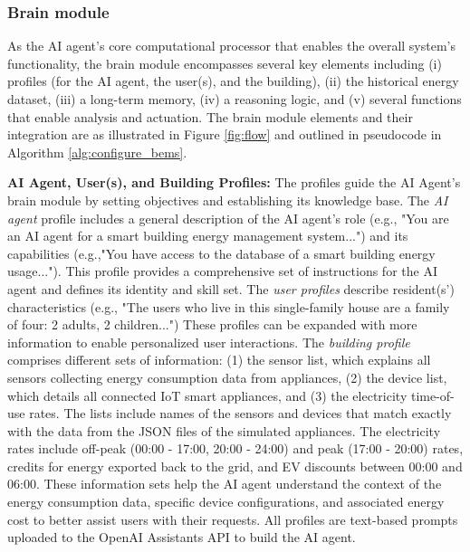 \documentclass[final,3p,times]{elsarticle}
\begin{document}
\subsubsection{Brain module} \label{subsec:prot. brain module}

As the AI agent’s core computational processor that enables the overall system's functionality, the brain module encompasses several key elements including (i) profiles (for the AI agent, the user(s), and the building), (ii) the historical energy dataset, (iii) a long-term memory, (iv) a reasoning logic, and (v) several functions that enable analysis and actuation. The brain module elements and their integration are as illustrated in Figure \ref{fig:flow} and outlined in pseudocode in Algorithm \ref{alg:configure_bems}.

\textbf{AI Agent, User(s), and Building Profiles:} The profiles guide the AI Agent’s brain module by setting objectives and establishing its knowledge base. The \textit{AI agent} profile includes a general description of the AI agent’s role (e.g., "You are an AI agent for a smart building energy management system...") and its capabilities (e.g.,"You have access to the database of a smart building energy usage..."). This profile provides a comprehensive set of instructions for the AI agent and defines its identity and skill set. The \textit{user profiles} describe resident(s') characteristics (e.g., "The users who live in this single-family house are a family of four: 2 adults, 2 children...") These profiles can be expanded with more information to enable personalized user interactions. The \textit{building profile} comprises different sets of information: (1) the sensor list, which explains all sensors collecting energy consumption data from appliances, (2) the device list, which details all connected IoT smart appliances, and (3) the electricity time-of-use rates. The lists include names of the sensors and devices that match exactly with the data from the JSON files of the simulated appliances. The electricity rates include off-peak (00:00 - 17:00, 20:00 - 24:00) and peak (17:00 - 20:00) rates, credits for energy exported back to the grid, and EV discounts between 00:00 and 06:00. These information sets help the AI agent understand the context of the energy consumption data, specific device configurations, and associated energy cost to better assist users with their requests. All profiles are text-based prompts uploaded to the OpenAI Assistants API to build the AI agent.
\end{document}
